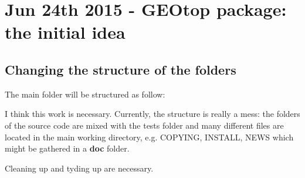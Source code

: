 \section{Jun 24th 2015 - GEOtop package: the initial idea}\label{sec:20150624}
\subsection{Changing the structure of the folders}

The main folder will be structured as follow:

\vspace{10pt}



\noindent I think this work is necessary. Currently, the structure is
really a mess: the folders of the source code are mixed with the tests
folder and many different files are located in the main working
directory, e.g. COPYING, INSTALL, NEWS which might be gathered in a
\textbf{doc} folder.\par\medskip

\noindent Cleaning up and tyding up are necessary.
